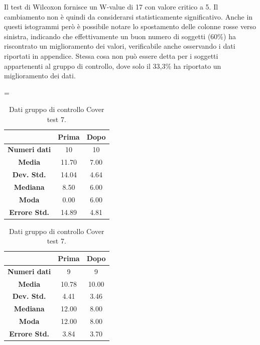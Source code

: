 Il test di Wilcoxon fornisce un W-value di 17 con valore critico a 5. Il cambiamento non è quindi da considerarsi statisticamente significativo. Anche in questi istogrammi però è possibile notare lo spostamento delle colonne rosse verso sinistra, indicando che effettivamente un buon numero di soggetti (60\%) ha riscontrato un miglioramento dei valori, verificabile anche osservando i dati riportati in appendice. Stessa cosa non può essere detta per i soggetti appartenenti al gruppo di controllo, dove solo il 33,3\% ha riportato un miglioramento dei dati.

\begin{table}
\centering
\setlength\tabcolsep{4pt}
\begin{minipage}{0.48\textwidth}
\centering
\tablewidth=\textwidth

\begin{tabular}{|c|c|c|} \hline
{\textbf{}} & {\textbf{  \hspace{8pt}Prima\hspace{8pt} }} & {\textbf{ \hspace{8pt}Dopo\hspace{8pt}  }}\\ \hline
\textbf{Numeri dati} & 10 & 10 \\ 
\textbf{Media} & 11.70 & 7.00 \\  
\textbf{Dev. Std.} & 14.04 & 4.64 \\  
\textbf{Mediana} & 8.50 & 6.00 \\ 
\textbf{Moda} & 0.00 & 6.00 \\ 
\textbf{Errore Std.} & 14.89 & 4.81 \\ 
\hline
\end{tabular}
\caption{Dati gruppo sperimentale Cover test 7.}

\label{tab:accuracy} 
\end{minipage}%
\hfill
\begin{minipage}{0.48\textwidth}
\centering

\begin{tabular}{|c|c|c|} \hline
{\textbf{}} & {\textbf{  \hspace{8pt}Prima\hspace{8pt} }} & {\textbf{ \hspace{8pt}Dopo\hspace{8pt}  }}\\ \hline
\textbf{Numeri dati} & 9 & 9 \\ 
\textbf{Media} & 10.78 & 10.00 \\  
\textbf{Dev. Std.} & 4.41 & 3.46 \\  
\textbf{Mediana} & 12.00 & 8.00 \\  
\textbf{Moda} & 12.00 & 8.00 \\
\textbf{Errore Std.} & 3.84 & 3.70 \\
\hline
\end{tabular}
\caption{Dati gruppo di controllo Cover test 7.}

 \label{tab:ompdiff} 
\end{minipage}
\end{table}
